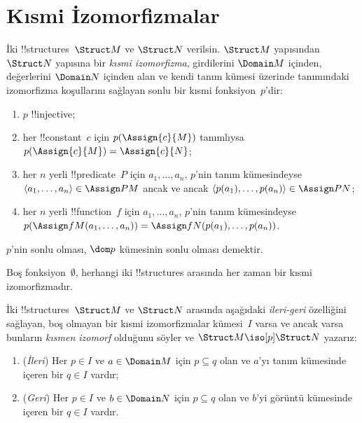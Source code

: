 

\section{Kısmi İzomorfizmalar}

\begin{defn}
  İki !!{structure}s~$\Struct M$ ve $\Struct N$ verilsin. $\Struct M$
  yapısından $\Struct N$ yapısına bir \emph{kısmi izomorfizma},
  girdilerini $\Domain M$ içinden, değerlerini $\Domain N$ içinden alan
  ve kendi tanım kümesi üzerinde 
  tanımındaki izomorfizma koşullarını sağlayan sonlu bir kısmi
  fonksiyon~$p$'dir:
  \begin{enumerate}
  \item $p$ !!{injective};
  \item her !!{constant}~$c$ için $p(\Assign{c}{M})$ tanımlıysa
    $p(\Assign{c}{M})=\Assign{c}{N}$;
  \item her $n$ yerli !!{predicate}~$P$ için $a_1,\dots,a_n$,
    $p$'nin tanım kümesindeyse
    $\langle a_1,\dots,a_n\rangle\in\Assign P M$ ancak ve ancak
    $\langle p(a_1),\dots,p(a_n)\rangle\in\Assign P N$;
  \item her $n$ yerli !!{function}~$f$ için $a_1,\dots,a_n$,
    $p$'nin tanım kümesindeyse
    $p(\Assign f M(a_1,\dots,a_n))=
    \Assign f N(p(a_1),\dots,p(a_n))$.
  \end{enumerate}
  $p$'nin sonlu olması, $\dom p$ kümesinin sonlu olması demektir.
\end{defn}

Boş fonksiyon~$\emptyset$, herhangi iki !!{structure}s arasında her
zaman bir kısmi izomorfizmadır.

\begin{defn}
  İki !!{structure}s~$\Struct M$ ve $\Struct N$ arasında aşağıdaki
  \emph{ileri-geri} özelliğini sağlayan, boş olmayan bir kısmi
  izomorfizmalar kümesi~$I$ varsa ve ancak varsa bunların \emph{kısmen
  izomorf} olduğunu söyler ve $\Struct M\iso[p]\Struct N$ yazarız:
  \begin{enumerate}
  \item (\emph{İleri}) Her $p\in I$ ve $a\in\Domain M$ için
    $p\subseteq q$ olan ve $a$'yı tanım kümesinde içeren bir $q\in I$
    vardır;
  \item (\emph{Geri}) Her $p\in I$ ve $b\in\Domain N$ için
    $p\subseteq q$ olan ve $b$'yi görüntü kümesinde içeren bir $q\in I$
    vardır.
  \end{enumerate}
\end{defn}

